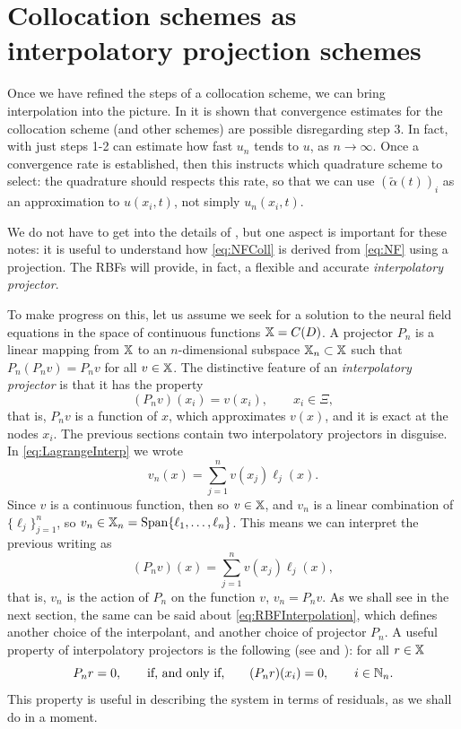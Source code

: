 \documentclass[a4paper]{siamart190516}
\begin{document}
\section{Collocation schemes as interpolatory projection schemes}\label{sec:projectionSchemes} 

Once we have refined the steps of a collocation scheme, we can bring interpolation
into the picture. In \cite{Avitabile:2023ab} it is shown that convergence estimates
for the collocation scheme (and other schemes) are possible disregarding step 3. In
fact, with just steps 1-2 can estimate how fast $u_n$ tends to $u$, as $n \to \infty$.
Once a convergence rate is established, then this instructs which quadrature scheme
to select: the quadrature should respects this rate, so that we can use $(\tilde
\alpha(t))_i$ as an approximation to $u(x_i,t)$, not simply $u_n(x_i,t)$. 

We do not have to get into the details of
\cite{Avitabile:2023ab}, but one aspect is important for these
notes: it is useful to understand how \cref{eq:NFColl} is derived from \cref{eq:NF}
using a projection. The RBFs will provide, in fact, a flexible and accurate
\textit{interpolatory projector}. 

To make progress on this, let us assume we seek for a solution to the neural field
equations in the space of continuous functions $\mathbb{X} = C(D)$. A projector $P_n$ is a
linear mapping from $\mathbb{X}$ to an $n$-dimensional subspace $\mathbb{X}_n \subset \mathbb{X}$
such that $P_n (P_n v) = P_n v$ for all $v \in \mathbb{X}$. The distinctive feature of an
\textit{interpolatory projector} is that it has the property  
\[
  (P_n v)(x_i) = v(x_i), \qquad x_i \in \Xi,
\] 
that is, $P_n v$ is a function of $x$, which approximates $v(x)$, and it is exact
at the nodes $x_i$. The previous sections contain two interpolatory projectors in
disguise. In \cref{eq:LagrangeInterp} we wrote
\[
  v_n(x) = \sum_{j=1}^{n} v(x_j) \ell_j(x). 
\]
Since $v$ is a continuous function, then so $v \in \mathbb{X}$, and $v_n$ is a linear combination
of $\{ \ell_j \}_{j=1}^n$, so $v_n \in \mathbb{X}_n = \operatorname{Span} \{ \ell_1, \ldots, \ell_n \}$.
This means we can interpret the previous writing as
\[
  (P_n v)(x) = \sum_{j=1}^{n} v(x_j) \ell_j(x),
\]
that is, $v_n$ is the action of $P_n$ on the function $v$, $v_n = P_n v$. As we shall
see in the next section, the same can be said about \cref{eq:RBFInterpolation}, which
defines another choice of the interpolant, and another choice of projector $P_n$. A
useful property of interpolatory projectors is the following (see
\cite{atkinson1997,atkinson2005theoretical} and \cite[Proposition
4.1]{Avitabile:2023ab}): for all $r \in \mathbb{X}$
\begin{equation}\label{eq:projCollProperty}
P_n r = 0, 
\qquad \text{if, and only if,} \qquad 
(P_n r)(x_i) = 0, \qquad i \in \NSet_n.
\end{equation}
This property is useful in describing the system in terms of residuals, as we shall do
in a moment.
\end{document}
